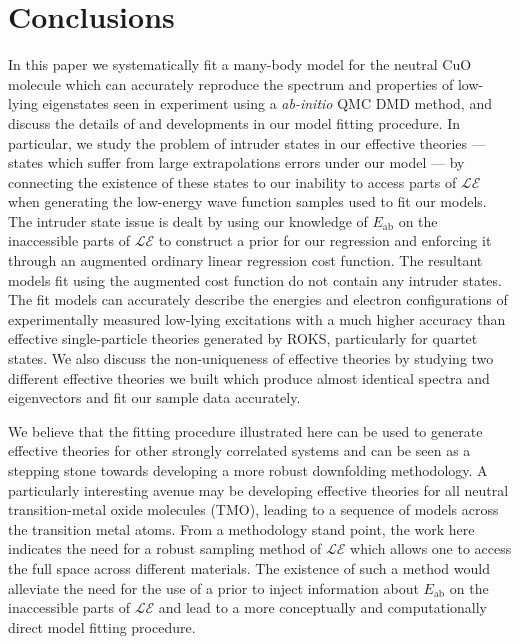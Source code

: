 \documentclass{article}
\begin{document}
\section{Conclusions}
In this paper we systematically fit a many-body model for the neutral CuO molecule which can accurately reproduce the spectrum and properties of low-lying eigenstates seen in experiment using a \textit{ab-initio} QMC DMD method, and discuss the details of and developments in our model fitting procedure.
In particular, we study the problem of intruder states in our effective theories --- states which suffer from large extrapolations errors under our model ---  by connecting the existence of these states to our inability to access parts of $\mathcal{LE}$ when generating the low-energy wave function samples used to fit our models.
The intruder state issue is dealt by using our knowledge of $E_\text{ab}$ on the inaccessible parts of $\mathcal{LE}$ to construct a prior for our regression and enforcing it through an augmented ordinary linear regression cost function.
The resultant models fit using the augmented cost function do not contain any intruder states.
The fit models can accurately describe the energies and electron configurations of experimentally measured low-lying excitations with a much higher accuracy than effective single-particle theories generated by ROKS, particularly for quartet states.
We also discuss the non-uniqueness of effective theories by studying two different effective theories we built which produce almost identical spectra and eigenvectors and fit our sample data accurately.

We believe that the fitting procedure illustrated here can be used to generate effective theories for other strongly correlated systems and can be seen as a stepping stone towards developing a more robust downfolding methodology. 
A particularly interesting avenue may be developing effective theories for all neutral transition-metal oxide molecules (TMO), leading to a sequence of models across the transition metal atoms. 
From a methodology stand point, the work here indicates the need for a robust sampling method of $\mathcal{LE}$ which allows one to access the full space across different materials.
The existence of such a method would alleviate the need for the use of a prior to inject information about $E_\text{ab}$ on the inaccessible parts of $\mathcal{LE}$ and lead to a more conceptually and computationally direct model fitting procedure. 
\end{document}
